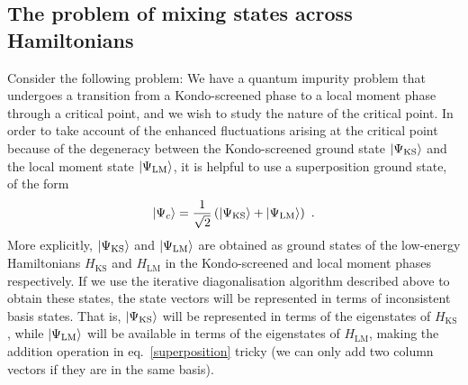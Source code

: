 \documentclass[reprint]{revtex4-2}
\begin{document}
\subsection{The problem of mixing states across Hamiltonians}
Consider the following problem: We have a quantum impurity problem that undergoes a transition from a Kondo-screened phase to a local moment phase through a critical point, and we wish to study the nature of the critical point. In order to take account of the enhanced fluctuations arising at the critical point because of the degeneracy between the Kondo-screened ground state \(\ket{\Psi_\text{KS}}\) and the local moment state \(\ket{\Psi_\text{LM}}\), it is helpful to use a superposition ground state, of the form
\begin{equation}\begin{aligned}\label{superposition}
	\ket{\Psi_c} = \frac{1}{\sqrt 2}\left(\ket{\Psi_\text{KS}} + \ket{\Psi_\text{LM}}\right) ~.
\end{aligned}\end{equation}
More explicitly, \(\ket{\Psi_\text{KS}}\) and \(\ket{\Psi_\text{LM}}\) are obtained as ground states of the low-energy Hamiltonians \(H_\text{KS}\) and \(H_\text{LM}\) in the Kondo-screened and local moment phases respectively. If we use the iterative diagonalisation algorithm described above to obtain these states, the state vectors will be represented in terms of inconsistent basis states. That is, \(\ket{\Psi_\text{KS}}\) will be represented in terms of the eigenstates of \(H_\text{KS}\), while \(\ket{\Psi_\text{LM}}\) will be available in terms of the eigenstates of \(H_\text{LM}\), making the addition operation in eq.~\ref{superposition} tricky (we can only add two column vectors if they are in the same basis).
\end{document}
